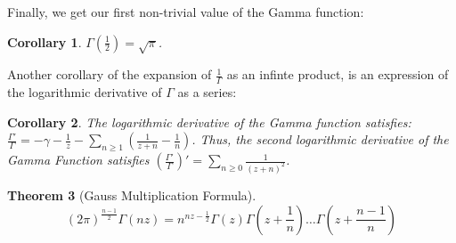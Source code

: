 \documentclass[11pt]{article} %
\newtheorem{theorem}{Theorem}[section]
\newtheorem{corollary}[theorem]{Corollary}
\theoremstyle{definition}
\theoremstyle{remark}
\begin{document}
Finally, we get our first non-trivial value of the Gamma function:

\begin{corollary}
$\Gamma\left(\frac{1}{2}\right) = \sqrt{\pi}$.
\end{corollary}

Another corollary of the expansion of $\frac{1}{\Gamma}$ as an infinte product, is an expression of the logarithmic derivative of $\Gamma$ as a series:

\begin{corollary}
The logarithmic derivative of the Gamma function satisfies: $\frac{\Gamma'}{\Gamma} = -\gamma - \frac{1}{z} - \sum_{n\geq 1}\left(\frac{1}{z+n} - \frac{1}{n}\right)$. Thus, the second logarithmic derivative of the Gamma Function satisfies $\left(\frac{\Gamma'}{\Gamma}\right)' = \sum _{n \geq 0}\frac{1}{\left(z+n\right)^2}$.
\end{corollary}

\begin{theorem}[Gauss Multiplication Formula]
\[ \left(2\pi\right)^{\frac{n-1}{2}}\Gamma\left(nz\right) = n^{nz - \frac{1}{2}}\Gamma\left(z\right)\Gamma\left(z+\frac{1}{n}\right)\dots\Gamma\left(z+\frac{n-1}{n}\right)\]  
\end{theorem}
\end{document}
